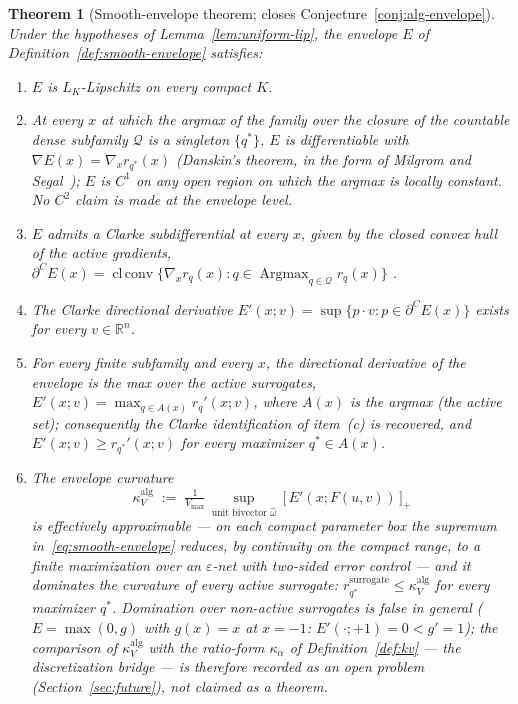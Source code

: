 \documentclass[11pt,a4paper]{article}
\theoremstyle{plain}
\newtheorem{theorem}{Theorem}[section]
\theoremstyle{definition}
\theoremstyle{remark}
\newcommand{\kk}{\kappa_{\!V}}
\newcommand{\RR}{\mathbb{R}}
\begin{document}
\begin{theorem}[Smooth-envelope theorem; closes
Conjecture~\ref{conj:alg-envelope}]
\label{thm:smooth-envelope}
Under the hypotheses of Lemma~\ref{lem:uniform-lip}, the envelope $E$
of Definition~\ref{def:smooth-envelope} satisfies:
\begin{enumerate}[leftmargin=*,itemsep=2pt]
\item[(a)] $E$ is $L_K$-Lipschitz on every compact $K$.
\item[(b)] At every $x$ at which the argmax of the family over the
  closure of the countable dense subfamily $\mathcal{Q}$ is a
  singleton $\{q^*\}$, $E$ is differentiable with $\nabla E(x) =
  \nabla_x r_{q^*}(x)$ (Danskin's theorem, in the form of Milgrom
  and Segal~\citep{milgromsegal2002}); $E$ is $C^1$ on any open
  region on which the
  argmax is locally constant. No $C^2$ claim is made at the envelope
  level.
\item[(c)] $E$ admits a Clarke subdifferential at every $x$, given
  by the closed convex hull of the active gradients,
  $\partial^{C}E(x) = \operatorname{cl\,conv}\bigl\{\nabla_x r_q(x) :
  q \in \operatorname{Argmax}_{q \in \mathcal{Q}} r_q(x)\bigr\}$
  \citep{clarke1975}.
\item[(d)] The Clarke directional derivative $E'(x; v) = \sup\{p
  \cdot v : p \in \partial^{C}E(x)\}$ exists for every
  $v \in \RR^{n}$.
\item[(e1)] For every finite subfamily and every $x$, the
directional derivative of the envelope is the max over the
\emph{active} surrogates,
$E'(x; v) = \max_{q \in A(x)} r_q'(x; v)$, where $A(x)$ is the
argmax (the active set); consequently the Clarke identification of
item~(c) is recovered, and $E'(x; v) \geq r_{q^*}'(x; v)$ for
every \emph{maximizer} $q^{*} \in A(x)$.
\item[(e2)] The envelope curvature
\begin{equation}\label{eq:kappa-alg}
  \kk^{\mathrm{alg}} \;:=\;
  \tfrac{1}{V_{\max}}\,
  \sup_{\text{unit bivector } \hat\omega}\,
  \bigl[\,E'(x; F(u, v))\,\bigr]_+
\end{equation}
is effectively approximable --- on each compact parameter box the
supremum in~\eqref{eq:smooth-envelope} reduces, by continuity on
the compact range, to a finite maximization over an
$\varepsilon$-net with two-sided error control --- and it
dominates the curvature of every \emph{active} surrogate:
$r_{q^*}^{\mathrm{surrogate}} \leq \kk^{\mathrm{alg}}$ for every
maximizer $q^{*}$. Domination over \emph{non-active} surrogates is
false in general
($E=\max(0,g)$ with $g(x)=x$ at $x=-1$: $E'(\cdot;+1)=0 <
g'=1$); the comparison of $\kk^{\mathrm{alg}}$ with the
ratio-form $\kappa_\alpha$ of Definition~\ref{def:kv} --- the
discretization bridge --- is therefore recorded as an open
problem (Section~\ref{sec:future}), not claimed as a theorem.
\end{enumerate}
\end{theorem}
\end{document}
